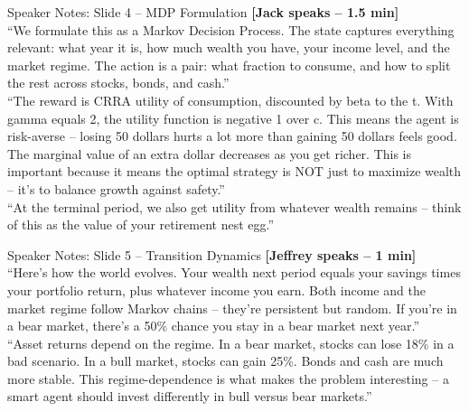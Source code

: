 \documentclass[aspectratio=169, 11pt]{beamer}
\begin{document}
\begin{frame}[allowframebreaks]{Speaker Notes: Slide 4 -- MDP Formulation}
\textbf{[Jack speaks -- 1.5 min]}\\
``We formulate this as a Markov Decision Process. The state captures everything relevant: what year it is, how much wealth you have, your income level, and the market regime. The action is a pair: what fraction to consume, and how to split the rest across stocks, bonds, and cash.''\\[0.5em]
``The reward is CRRA utility of consumption, discounted by beta to the t. With gamma equals 2, the utility function is negative 1 over c. This means the agent is risk-averse -- losing 50 dollars hurts a lot more than gaining 50 dollars feels good. The marginal value of an extra dollar decreases as you get richer. This is important because it means the optimal strategy is NOT just to maximize wealth -- it's to balance growth against safety.''\\[0.5em]
``At the terminal period, we also get utility from whatever wealth remains -- think of this as the value of your retirement nest egg.''
\end{frame}

\begin{frame}[allowframebreaks]{Speaker Notes: Slide 5 -- Transition Dynamics}
\textbf{[Jeffrey speaks -- 1 min]}\\
``Here's how the world evolves. Your wealth next period equals your savings times your portfolio return, plus whatever income you earn. Both income and the market regime follow Markov chains -- they're persistent but random. If you're in a bear market, there's a 50\% chance you stay in a bear market next year.''\\[0.5em]
``Asset returns depend on the regime. In a bear market, stocks can lose 18\% in a bad scenario. In a bull market, stocks can gain 25\%. Bonds and cash are much more stable. This regime-dependence is what makes the problem interesting -- a smart agent should invest differently in bull versus bear markets.''
\end{frame}
\end{document}
